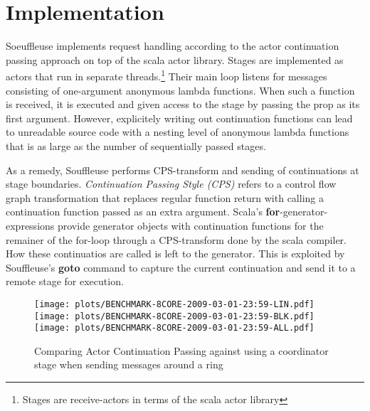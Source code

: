 \documentclass[preprint]{sigplanconf}
\begin{document}
                                                       



                                       


\section{Implementation}                                   

Soeuffleuse implements request handling according to the actor continuation passing approach on top
of the scala actor library. Stages are implemented as actors that run in separate
threads.\footnote{Stages are receive-actors in terms of the scala actor library} Their main loop
listens for messages consisting of one-argument anonymous lambda functions. When such a function is
received, it is executed and given access to the stage by passing the prop as its first argument.
However, explicitely writing out continuation functions can lead to unreadable source code with a
nesting level of anonymous lambda functions that is as large as the number of sequentially passed
stages.

As a remedy, Souffleuse performs CPS-transform and sending of continuations at stage boundaries.
\emph{Continuation Passing Style (CPS)} refers to a control flow graph transformation that replaces
regular function return with calling a continuation function passed as an extra argument. Scala's
\textbf{for}-generator-expressions provide generator objects with continuation functions for the
remainer of the for-loop through a CPS-transform done by the scala compiler. How these continuatios
are called is left to the generator. This is exploited by Souffleuse's \textbf{goto} command to
capture the current continuation and send it to a remote stage for execution.    
        
\begin{figure*}[t]    
\begin{center}
\texttt{[image: plots/BENCHMARK-8CORE-2009-03-01-23:59-LIN.pdf]}%
\texttt{[image: plots/BENCHMARK-8CORE-2009-03-01-23:59-BLK.pdf]}%
\texttt{[image: plots/BENCHMARK-8CORE-2009-03-01-23:59-ALL.pdf]}
\end{center}
\caption{Comparing Actor Continuation Passing against using a coordinator stage when sending messages around a ring\label{fig:eval}} 
\end{figure*}
\end{document}
